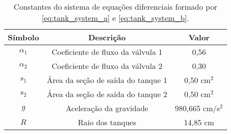 \begin{table}[ht]
  \centering
  \caption{Constantes do sistema de equações diferenciais formado por \eqref{eq:tank_system_a} e \eqref{eq:tank_system_b}.}
  \label{tab:tanks_params}
  \begin{tabular}{ccc}
    \hline
    Símbolo    & Descrição                          & Valor            \\ \hline
    $\alpha_1$ & Coeficiente de fluxo da válvula 1  & 0,56             \\
    $\alpha_2$ & Coeficiente de fluxo da válvula 2  & 0,30             \\
    $s_1$      & Área da seção de saída do tanque 1 & 0,50 cm$^2$      \\
    $s_2$      & Área da seção de saída do tanque 2 & 0,50 cm$^2$      \\
    $g$        & Aceleração da gravidade            & 980,665 cm/s$^2$ \\
    $R$        & Raio dos tanques                   & 14,85 cm         \\ \hline
  \end{tabular}
\end{table}